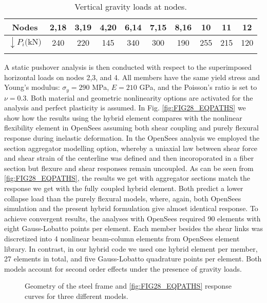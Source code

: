 \begin{table}[h]
	\centering
	\begin{minipage}{0.7\linewidth}
		\caption{Vertical gravity loads at nodes.}
		\begin{tabular}{cccccccccc}
			\toprule\toprule
			Nodes                         & 2,18 & 3,19 & 4,20& 6,14 & 7,15 & 
			8,16 & 10 & 11 & 12 \\
			\midrule
			$\downarrow P_i \text{(kN)}$  & 240  & 220  & 145 & 340 & 300 & 190 
			& 255 & 215 & 120 \\
			\bottomrule\bottomrule
			\label{table:TABLE10}
		\end{tabular}
	\end{minipage}
\end{table}

A static pushover analysis is then conducted with respect to the 
superimposed horizontal loads on nodes 2,3, 
and 4. All members have 
the same yield stress and Young's modulus: $\sigma_y = 290$ MPa, $E = 210$ GPa, 
and the Poisson's ratio is set to $\nu= 0.3$. Both material and geometric 
nonlinearity options are activated for the 
analysis and perfect plasticity is assumed. In Fig. \ref{fig:FIG28_EQPATHS} we 
show how the results using the 
hybrid element compares with the nonlinear flexibility element in 
OpenSees\cite{OpenSees} assuming both shear coupling and purely flexural 
response during inelastic deformation. In the OpenSees analysis we employed the 
section aggregator modelling option, whereby a uniaxial law between shear force 
and shear strain of the centerline was defined and then incoroporated in a 
fiber section but flexure and shear responses remain uncoupled. As can be seen 
from \ref{fig:FIG28_EQPATHS}, the results we get with aggregator sections match 
the response we get with the fully coupled hybrid element. Both predict a lower 
collapse load than the purely flexural models, where, again, both OpenSees 
simulation and the present hybrid formulation give almost identical response. 
To 
achieve convergent results, the analyses with OpenSees required 90 elements 
with eight Gauss-Lobatto points per element. Each member besides the shear 
links was discretized into 4 nonlinear beam-column elements from OpenSees 
element library. In contrast, in our hybrid code we used one hybrid element per 
member, 27 elements in total, and five Gauss-Lobatto quadrature points per 
element. Both models account for second order effects under the presence of 
gravity loads.

\begin{figure}
	\centering
	\caption{Geometry of the steel frame and \ref{fig:FIG28_EQPATHS} response 
		curves for three different models.}
	\label{fig:FIG28}
\end{figure}


